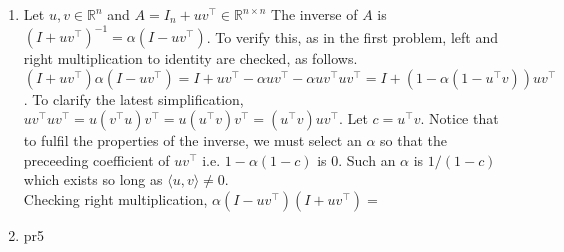 \documentclass[12pt,fleqn,leqno,letterpaper]{article}
\begin{document}
\begin{enumerate}
    \item Let $u,v\in\mathbb{R}^n$ and $A=I_n+uv^\top\in\mathbb{R}^{n\times n}$
        The inverse of $A$ is $(I+uv^\top)^{-1} = \alpha(I-uv^\top)$. To verify
        this, as in the first problem, left and right multiplication to identity
        are checked, as follows.\\
        $(I+uv^\top)\alpha(I-uv^\top) =
        I + uv^\top - \alpha uv^\top - \alpha uv^\top uv^\top =
        I + (1 - \alpha(1 - u^\top v)) uv^\top$.
        To clarify the latest simplification,
        $uv^\top uv^\top = u(v^\top u)v^\top = u(u^\top v)v^\top =
        (u^\top v) uv^\top$. Let $c=u^\top v$.
        Notice that to fulfil the properties of the inverse, we must select an
        $\alpha$ so that the preceeding coefficient of $uv^\top$ i.e.
        $1-\alpha(1-c)$ is $0$. Such an $\alpha$ is
        $1/(1-c)$ which exists so long as $\langle u, v \rangle \neq
        0$.\\
        Checking right multiplication,
        $\alpha(I-uv^\top)(I+uv^\top) =$

    \item pr5
\end{enumerate}


% 
\end{document}
